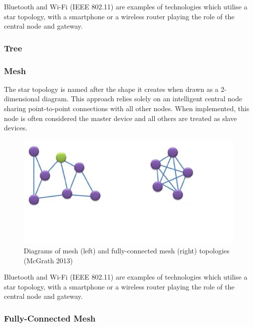 Bluetooth and Wi-Fi (IEEE 802.11) are examples of technologies which utilise a star topology, with a smartphone or a wireless router playing the role of the central node and gateway.


\subsubsection{Tree}



\subsubsection{Mesh}

The star topology is named after the shape it creates when drawn as a 2-dimensional diagram. This approach relies solely on an intelligent central node sharing point-to-point connections with all other nodes. When implemented, this node is often considered the master device and all others are treated as slave devices.

\begin{figure}[h]
\centering
\includegraphics{Figures/mesh-fully-connected-mesh-topology.JPG}
\decoRule
\caption[Mesh and fully-connected mesh network topologies]{Diagrams of mesh (left) and fully-connected mesh (right) topologies (McGrath 2013)}
\label{fig:StarTreeTopology}
\end{figure}

Bluetooth and Wi-Fi (IEEE 802.11) are examples of technologies which utilise a star topology, with a smartphone or a wireless router playing the role of the central node and gateway.


\subsubsection{Fully-Connected Mesh}


